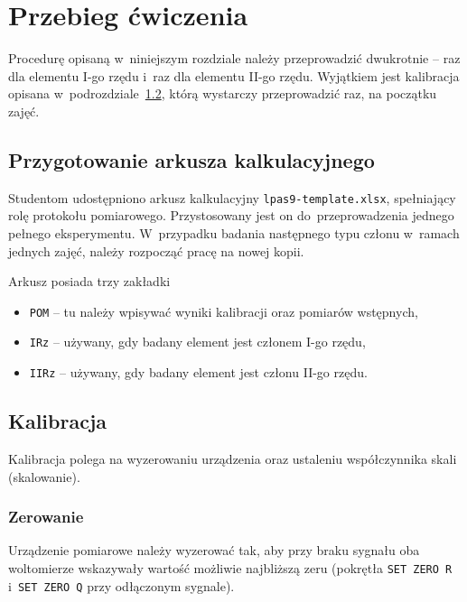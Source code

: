 \documentclass[paper=a4,DIV=12]{lpas}
\begin{document}
\section{Przebieg ćwiczenia}
\label{sec:0DR40}

Procedurę opisaną w~niniejszym rozdziale należy przeprowadzić dwukrotnie -- raz
dla elementu I-go rzędu i~raz dla elementu II-go rzędu. Wyjątkiem jest
kalibracja opisana w~podrozdziale~\ref{sec:VDTSB}, którą wystarczy
przeprowadzić raz, na początku zajęć.

\subsection{Przygotowanie arkusza kalkulacyjnego}
\label{sec:S5JXT}

Studentom udostępniono arkusz kalkulacyjny \texttt{lpas9-template.xlsx},
spełniający rolę protokołu pomiarowego. Przystosowany jest on
do~przeprowadzenia jednego pełnego eksperymentu. W~przypadku badania następnego
typu członu w~ramach jednych zajęć, należy rozpocząć pracę na nowej kopii.

Arkusz posiada trzy zakładki
\begin{itemize}
  \item \texttt{POM} -- tu należy wpisywać wyniki kalibracji oraz pomiarów
    wstępnych,
  \item \texttt{IRz} -- używany, gdy badany element jest członem I-go rzędu,
  \item \texttt{IIRz} -- używany, gdy badany element jest członu II-go rzędu.
\end{itemize}

\subsection{Kalibracja}
\label{sec:VDTSB}

Kalibracja polega na wyzerowaniu urządzenia oraz ustaleniu współczynnika skali
(skalowanie).

\subsubsection{Zerowanie}
\label{sec:6OYTI}

Urządzenie pomiarowe należy wyzerować tak, aby przy braku sygnału oba
woltomierze wskazywały wartość możliwie najbliższą zeru (pokrętła \texttt{SET
ZERO R} i~\texttt{SET ZERO Q} przy odłączonym sygnale).
\end{document}
